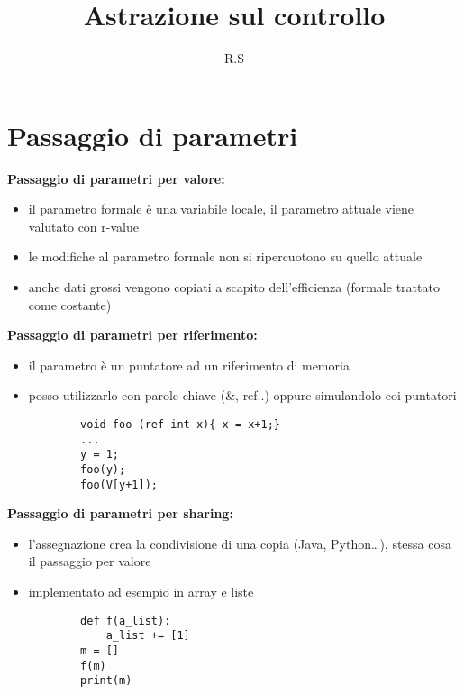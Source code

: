 \documentclass{article}
\title{Astrazione sul controllo}
\author{R.S}
\begin{document}
\maketitle

\section*{Passaggio di parametri}

\begin{flushleft}
    
\textbf{Passaggio di parametri per valore:} \\
\begin{itemize}
    \item il parametro formale è una variabile locale, il parametro attuale viene valutato con r-value
    \item le modifiche al parametro formale non si ripercuotono su quello attuale
	\item anche dati grossi vengono copiati a scapito dell'efficienza (formale trattato come costante)
\end{itemize}

\medskip

\textbf{Passaggio di parametri per riferimento:} \\
\begin{itemize}
    \item il parametro è un puntatore ad un riferimento di memoria
    \item posso utilizzarlo con parole chiave (\&, ref..) oppure simulandolo coi puntatori
    \begin{lstlisting}
        void foo (ref int x){ x = x+1;}
        ...
        y = 1;
        foo(y);
        foo(V[y+1]);
    \end{lstlisting}
\end{itemize}

\medskip

\textbf{Passaggio di parametri per sharing:} \\
\begin{itemize}
    \item l'assegnazione crea la condivisione di una copia (Java, Python…), stessa cosa il passaggio per valore
    \item implementato ad esempio in array e liste
    \begin{lstlisting}
        def f(a_list):
            a_list += [1]
        m = []
        f(m)
        print(m)
    \end{lstlisting}
 

\end{itemize}
\end{flushleft}
\end{document}
